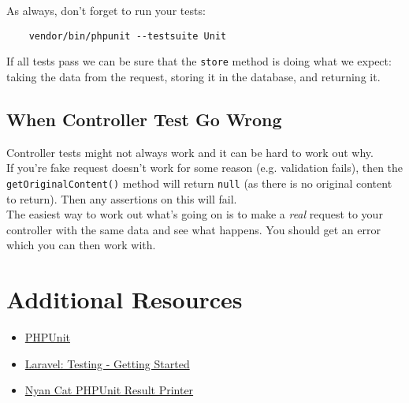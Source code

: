 As always, don't forget to run your tests:

\begin{verbatim}
    vendor/bin/phpunit --testsuite Unit
\end{verbatim}

If all tests pass we can be sure that the \texttt{store} method is doing what we expect: taking the data from the request, storing it in the database, and returning it.

\subsection{When Controller Test Go Wrong}

Controller tests might not always work and it can be hard to work out why.
\\

If you're fake request doesn't work for some reason (e.g. validation fails), then the \texttt{getOriginalContent()} method will return \texttt{null} (as there is no original content to return). Then any assertions on this will fail.
\\

The easiest way to work out what's going on is to make a \textit{real} request to your controller with the same data and see what happens. You should get an error which you can then work with.



\section{Additional Resources}

\begin{itemize}[leftmargin=*]
    \item \href{https://github.com/sebastianbergmann/phpunit}{PHPUnit}
    \item \href{http://laravel.com/docs/6.x/testing}{Laravel: Testing - Getting Started}
    \item \href{https://github.com/JeroenDeDauw/nyancat-phpunit-resultprinter}{Nyan Cat PHPUnit Result Printer}
\end{itemize}
